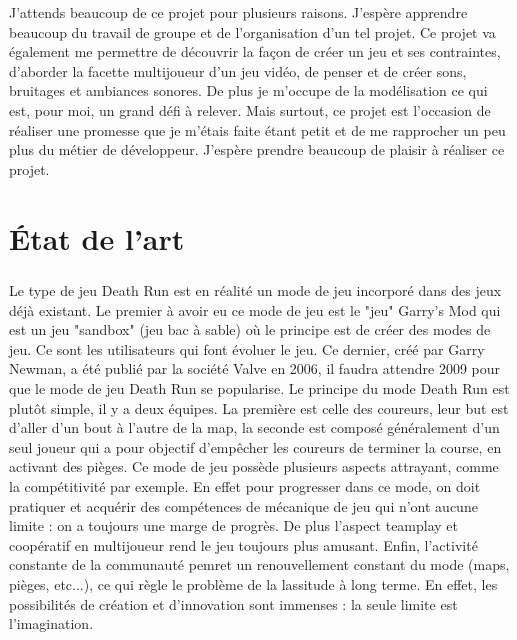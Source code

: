 \documentclass[12pt]{report}
\begin{document}
J'attends beaucoup de ce projet pour plusieurs raisons. J'espère apprendre beaucoup du travail de groupe et de l'organisation d'un tel projet. Ce projet va également me permettre de découvrir la façon de créer un jeu et ses contraintes, d'aborder la facette multijoueur d'un jeu vidéo, de penser et de créer sons, bruitages et ambiances sonores. De plus je m'occupe de la modélisation ce qui est, pour moi, un grand défi à relever. Mais surtout, ce projet est l'occasion de réaliser une promesse que je m'étais faite étant petit et de me rapprocher un peu plus du métier de développeur. J'espère prendre beaucoup de plaisir à réaliser ce projet.

\chapter{\'Etat de l'art}
	\paragraph{}
	Le type de jeu Death Run est en réalité un mode de jeu incorporé dans des jeux déjà existant. Le premier à avoir eu ce mode de jeu est le "jeu" Garry's Mod qui est un jeu "sandbox" (jeu bac à sable) où le principe est de créer des modes de jeu. Ce sont les utilisateurs qui font évoluer le jeu. Ce dernier, créé par Garry Newman, a été publié par la société Valve en 2006, il faudra attendre 2009 pour que le mode de jeu Death Run se popularise. Le principe du mode Death Run est plutôt simple, il y a deux équipes. La première est celle des coureurs, leur but est d'aller d'un bout à l'autre de la map, la seconde est composé généralement d'un seul joueur qui a pour objectif d'empêcher les coureurs de terminer la course, en activant des pièges. Ce mode de jeu possède plusieurs aspects attrayant, comme la compétitivité par exemple. En effet pour progresser dans ce mode, on doit pratiquer et acquérir des compétences de mécanique de jeu qui n'ont aucune limite : on a toujours une marge de progrès. De plus l'aspect teamplay et coopératif en multijoueur rend le jeu toujours plus amusant. Enfin, l'activité constante de la communauté pemret un renouvellement constant du mode (maps, pièges, etc...), ce qui règle le problème de la lassitude à long terme. En effet, les possibilités de création et d'innovation sont immenses : la seule limite est l'imagination.
\end{document}
